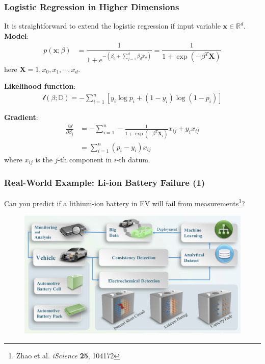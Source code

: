 \documentclass[10pt,aspectratio=169]{beamer}
\begin{document}
      \begin{frame}
        \frametitle{Logistic Regression in Higher Dimensions}

        It is straightforward to extend the logistic regression if
        input variable $\mathbf{x} \in \mathbb{R}^{d}$.  \vfill
        \textbf{Model}:
        \begin{align*}
          p(\mathbf{x}; \beta) &= \dfrac{1}{1 + e^{-(\beta_{0} + \sum_{j=1}^{d} \beta_{d} x_{d})}} = \dfrac{1}{1 + \exp(- \beta^{T} \mathbf{X})}
        \end{align*}
        here $\mathbf{X} = {1, x_{0}, x_{1}, \cdots, x_{d}}$.

        \vfill \textbf{Likelihood function}:
        \begin{align*}
          \mathscr{l}(\beta; \mathbb{D}) = -\sum_{i=1}^{n}\left[y_{i} \log p_{i} + (1 - y_{i})\log (1 - p_{i}) \right] 
        \end{align*}

        \vfill \textbf{Gradient}:
        \begin{align*}
          \frac{\partial \mathscr{l}}{\partial \beta_{j}}
          &= -\sum_{i=1}^{n} -\frac{1}{1 + \exp(-\beta^{T} \mathbf{X}_{i})} x_{ij} + y_{i}x_{ij} \\
          &= \sum_{i=1}^{n} (p_{i} - y_{i})x_{ij}
        \end{align*}
        where $x_{ij}$ is the $j$-th component in $i$-th datum.
        
      \end{frame}

      \begin{frame}
        \frametitle{Real-World Example: Li-ion Battery Failure (1)}

        Can you predict if a lithium-ion battery in EV will fail from
        measurements\let\thefootnote\relax\footnote{{\scriptsize Zhao
            et al. \textit{iScience} \textbf{25}, 104172}}?

        \begin{figure}[t]
          \includegraphics[width=0.9\linewidth]{images/battery_1.png}
        \end{figure}

      \end{frame}
\end{document}

